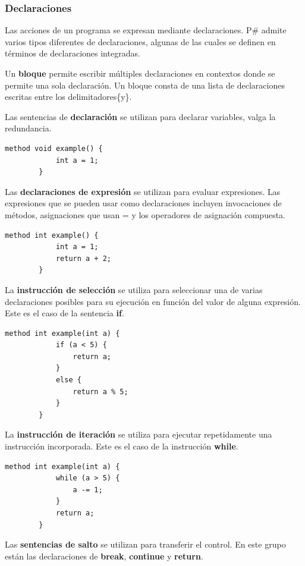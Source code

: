 \documentclass[12pt, letterpaper,spanish]{article}
\theoremstyle{definition}
\theoremstyle{remark}
\begin{document}
	\subsubsection{Declaraciones}
	Las acciones de un programa se expresan mediante declaraciones. P\# admite varios tipos diferentes de declaraciones, algunas de las cuales se definen en términos de declaraciones integradas.
	
	Un \textbf{bloque} permite escribir múltiples declaraciones en contextos donde se permite una sola declaración. Un bloque consta de una lista de declaraciones escritas entre los delimitadores\{y\}.
	
	Las sentencias de \textbf{declaración} se utilizan para declarar variables, valga la redundancia.
	
	\begin{lstlisting}[language={PySharp}]
		method void example() {
			int a = 1;
		}
	\end{lstlisting}
	
	Las \textbf{declaraciones de expresión} se utilizan para evaluar expresiones. Las expresiones que se pueden usar como declaraciones incluyen invocaciones de métodos, asignaciones que usan = y los operadores de asignación compuesta.
	
	\begin{lstlisting}[language={PySharp}]
		method int example() {
			int a = 1;
			return a + 2;
		}
	\end{lstlisting}
	
	La \textbf{instrucción de selección} se utiliza para seleccionar una de varias declaraciones posibles para su ejecución en función del valor de alguna expresión. Este es el caso de la sentencia \textbf{if}.
	
	\begin{lstlisting}[language={PySharp}]
		method int example(int a) {
			if (a < 5) {
				return a;
			}
			else {
				return a % 5;
			}
		}
	\end{lstlisting}
	
	La \textbf{instrucción de iteración} se utiliza para ejecutar repetidamente una instrucción incorporada. Este es el caso de la instrucción \textbf{while}.
	
	\begin{lstlisting}[language={PySharp}]
		method int example(int a) {
			while (a > 5) {				
				a -= 1;
			}
			return a;
		}
	\end{lstlisting}
	
	Las \textbf{sentencias de salto} se utilizan para transferir el control. En este grupo están las declaraciones de \textbf{break}, \textbf{continue} y \textbf{return}.
	
\end{document}
